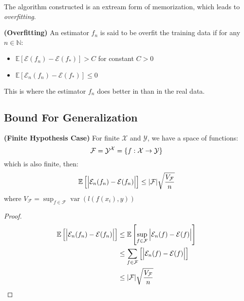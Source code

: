 \begin{remark}
    The algorithm constructed is an extream form of memorization, which leads to \emph{overfitting}.
\end{remark}

\begin{definition}{\textbf{(Overfitting)}}
    An estimator $f_n$ is said to be overfit the training data if for any $n\in\mathbb{N}$:
    \begin{itemize}
        \item $\mathbb{E}[\mathcal{E}(f_n) - \mathcal{E}(f_*)]> C$ for constant $C>0$
        \item $\mathbb{E}[\mathcal{E}_n(f_n) - \mathcal{E}(f_*)]\le0$
    \end{itemize}
    This is where the estimator $f_n$ does better in  than in the real data. 
\end{definition}

\subsection{Bound For Generalization}

\begin{theorem}{\textbf{(Finite Hypothesis Case)}}
    For finite $\mathcal{X}$ and $\mathcal{Y}$, we have a space of functions:
    \begin{equation*}
        \mathcal{F} = \mathcal{Y}^\mathcal{X} = \left\{ f : \mathcal{X} \rightarrow \mathcal{Y} \right\}
    \end{equation*}
    which is also finite, then:
    \begin{equation*}
        \mathbb{E}\left[ \Big| \mathcal{E}_n(f_n) - \mathcal{E}(f_n) \Big| \right] \le |\mathcal{F}|\sqrt{\frac{V_\mathcal{F}}{n}}
    \end{equation*}
    where $V_\mathcal{F} = \sup_{f\in\mathcal{F}}\operatorname{var}(l(f(x_i), y))$ 
\end{theorem}
\begin{proof}
    \begin{equation*}
    \begin{aligned}
        \mathbb{E}\left[ \Big| \mathcal{E}_n(f_n) - \mathcal{E}(f_n) \Big| \right]&\le \mathbb{E} \left[ \sup_{f\in\mathcal{F}}\Big| \mathcal{E}_n(f) - \mathcal{E}(f) \Big| \right]  \\
        &\le \sum_{f\in\mathcal{F}} \left[ \Big| \mathcal{E}_n(f) - \mathcal{E}(f) \Big| \right]  \\
        &\le | \mathcal{F} |\sqrt{\frac{V_\mathcal{F}}{n}}
    \end{aligned}
    \end{equation*}
\end{proof}


